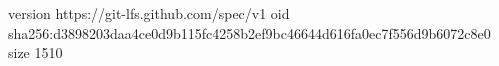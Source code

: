 version https://git-lfs.github.com/spec/v1
oid sha256:d3898203daa4ce0d9b115fc4258b2ef9bc46644d616fa0ec7f556d9b6072c8e0
size 1510
